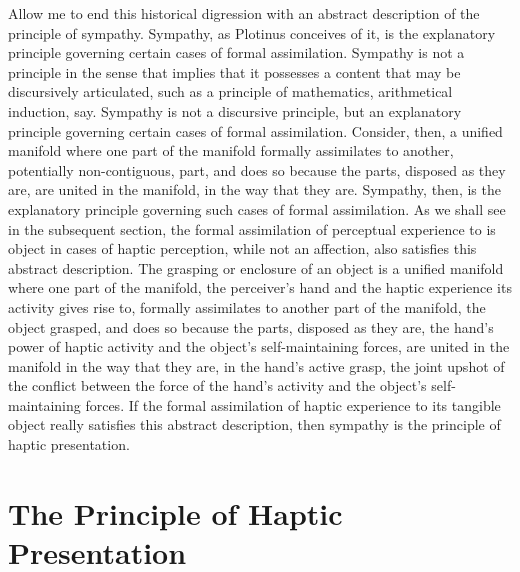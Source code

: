 Allow me to end this historical digression with an abstract description of the principle of sympathy. Sympathy, as Plotinus conceives of it, is the explanatory principle governing certain cases of formal assimilation. Sympathy is not a principle in the sense that implies that it possesses a content that may be discursively articulated, such as a principle of mathematics, arithmetical induction, say. Sympathy is not a discursive principle, but an explanatory principle governing certain cases of formal assimilation. Consider, then, a unified manifold where one part of the manifold formally assimilates to another, potentially non-contiguous, part, and does so because the parts, disposed as they are, are united in the manifold, in the way that they are. Sympathy, then, is the explanatory principle governing such cases of formal assimilation. As we shall see in the subsequent section, the formal assimilation of perceptual experience to is object in cases of haptic perception, while not an affection, also satisfies this abstract description. The grasping or enclosure of an object is a unified manifold where one part of the manifold, the perceiver's hand and the haptic experience its activity gives rise to, formally assimilates to another part of the manifold, the object grasped, and does so because the parts, disposed as they are, the hand’s power of haptic activity and the object's self-maintaining forces, are united in the manifold in the way that they are, in the hand's active grasp, the joint upshot of the conflict between the force of the hand’s activity and the object’s self-maintaining forces. If the formal assimilation of haptic experience to its tangible object really satisfies this abstract description, then sympathy is the principle of haptic presentation.



\section{The Principle of Haptic Presentation} %
\label{sec:sympathy_as_the_principle_of_haptic_presentation}

